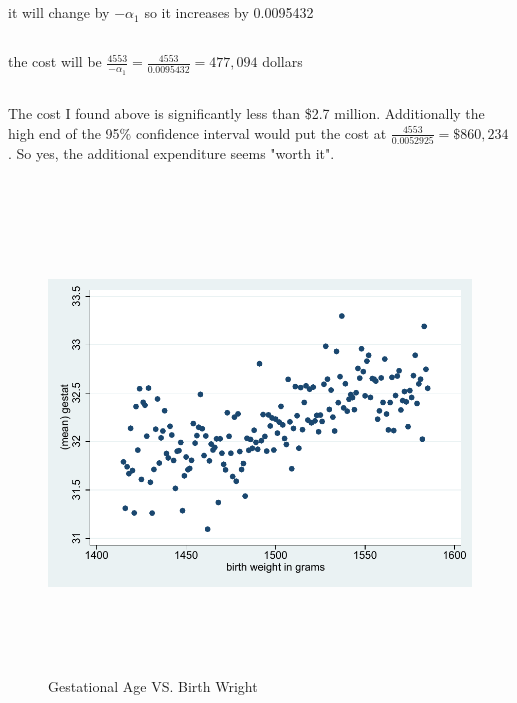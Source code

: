 \documentclass[11pt]{article}
\begin{document}
\subsection{}
it will change by $-\alpha_1$ so it increases by 0.0095432

\subsection{}
the cost will be $  \frac{4553}{-\alpha_1} =\frac{4553}{0.0095432} = 477,094$  dollars

\subsection{}
The cost I found above is significantly less than \$2.7 million. Additionally the high end of the 95\% confidence interval would put the cost at $ \frac{4553}{0.0052925} = \$ 860,234$. So yes, the additional expenditure seems "worth it". 

\subsection{}

\begin{figure}[H]
	\caption{Gestational Age VS. Birth Wright}\label{fig1}
	\begin{center}
		\includegraphics[height=5in,angle=0]{my_ps1_graph.pdf}
	\end{center}
\end{figure}
\end{document}

